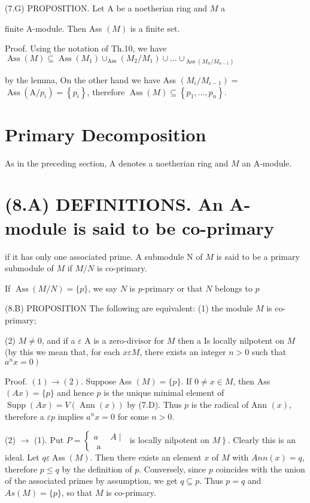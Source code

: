 (7.G) PROPOSITION. Let A be a noetherian ring and $M$ a

finite A-module. Then Ass $(M)$ is a finite set.

Proof. Using the notation of Th.10, we have $\operatorname{Ass}(M) \subseteq \operatorname{Ass}\left(M_{1}\right) \cup_{\operatorname{Ass}}\left(M_{2} / M_{1}\right) \cup \ldots \cup_{\operatorname{Ass}\left(M_{n} / M_{n-1}\right)}$

by the lemma, On the other hand we have Ass $\left(M_{i} / M_{i-1}\right)=$ $\operatorname{Ass}\left(\mathrm{A} / p_{i}\right)=\left\{p_{i}\right\}$, therefore $\operatorname{Ass}(M) \subseteq\left\{p_{1}, \ldots, p_{n}\right\}$.

\section{Primary Decomposition}
As in the preceding section, A denotes a noetherian ring and $M$ an A-module.

\section{(8.A) DEFINITIONS. An A-module is said to be co-primary}
if it has only one associated prime. A submodule $\mathrm{N}$ of $M$ is said to be a primary submodule of $M$ if $M / N$ is co-primary.

If $\operatorname{Ass}(M / N)=\{p\}$, we say $N$ is $p$-primary or that $N$ belongs to $p$

(8.B) PROPOSITION The following are equivalent: (1) the module $M$ is co-primary;

(2) $M \neq 0$, and if a $\varepsilon$ A is a zero-divisor for $M$ then a Is locally nilpotent on $M$ (by this we mean that, for each $x \varepsilon M$, there exists an integer $n>0$ such that $\left.a^{n} x=0\right)$

Proof. $(1) \rightarrow(2) .$ Suppose Ass $(M)=\{p\} .$ If $0 \neq x \in M$, then Ass $(A x)=\{p\}$ and hence $p$ is the unique minimal element of $\operatorname{Supp}(A x)=V(\operatorname{Ann}(x))$ by (7.D). Thus $p$ is the radical of Ann $(x)$, therefore a $\varepsilon p$ implies $a^{n} x=0$ for some $n>0$.

(2) $\rightarrow$ (1). Put $P=\left\{\begin{array}{ll}a & A \mid \\ \text { a }\end{array}\right.$ is locally nilpotent on $\left.M\right\}$. Clearly this is an ideal. Let $q \varepsilon \operatorname{Ass}(M)$. Then there exists an element $x$ of $M$ with $A n n(x)=q$, therefore $p \leq q$ by the definition of $p$. Conversely, since $p$ coincides with the union of the associated primes by assumption, we get $q \subseteq p$. Thus $p=q$ and $A s(M)=\{p\}$, so that $M$ is co-primary.

